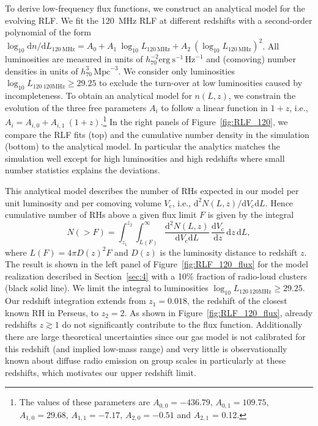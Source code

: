 \documentclass[traditabstract]{aa}
\newcommand{\rmn}{\mathrm}
\begin{document}
To derive low-frequency flux functions, we construct an analytical model for the
evolving RLF. We fit the 120~MHz RLF at different redshifts with a second-order
polynomial of the form $\log_{10} \rmn{d}n/\rmn{d}L_{120~\rmn{MHz}} = A_{0} +
A_{1}~\log_{10} L_{120~\rmn{MHz}} + A_{2}~(\log_{10} L_{120~\rmn{MHz}})^{2}$.
All luminosities are measured in units of $h_{70}^{-2}
\rmn{erg~s}^{-1}\,\rmn{Hz}^{-1}$ and (comoving) number densities in units of
$h_{70}^{3}\,\rmn{Mpc}^{-3}$. We consider only luminosities $\log_{10}
L_{120~\rmn{120MHz}} \geq 29.25$ to exclude the turn-over at low luminosities
caused by incompleteness. To obtain an analytical model for $n(L,z)$, we
constrain the evolution of the three free parameters $A_i$ to follow a linear
function in $1+z$, i.e., $A_{i} = A_{i,0} + A_{i,1}~(1+z)$.\footnote{The values
  of these parameters are $A_{0,0} = -436.79$, $A_{0,1} = 109.75$, $A_{1,0} =
  29.68$, $A_{1,1} = -7.17$, $A_{2,0} = -0.51$ and $A_{2,1}$ = 0.12.} In the
right panels of Figure~\ref{fig:RLF_120}, we compare the RLF fits (top) and the
cumulative number density in the simulation (bottom) to the analytical model. In
particular the analytics matches the simulation well except for high
luminosities and high redshifts where small number statistics explains the
deviations.

This analytical model describes the number of RHs expected in our model per unit
luminosity and per comoving volume $V_{\rmn{c}}$, i.e., $\rmn{d}^2N(L,z)
/\rmn{d}V_{\rmn{c}}\rmn{d}L$. Hence cumulative number of RHs above a given flux
limit $F$ is given by the integral
\begin{equation}
N(>F)  =  \int_{z_1}^{z_2} \int_{L(F)}^{\infty} 
\frac{\rmn{d}^2N(L,z)}{\rmn{d}V_{\rmn{c}}\rmn{d}L}\,
\frac{\rmn{d}V_{\rmn{c}}}{\rmn{d}z}\, \rmn{d}z\, \rmn{d}L ,
\label{eq:NtotRH}
\end{equation}
where $L(F) = 4 \pi D(z)^2 F$ and $D(z)$ is the luminosity distance to redshift
$z$.  The result is shown in the left panel of Figure~\ref{fig:RLF_120_flux} for
the model realization described in Section~\ref{sec:4} with a 10\% fraction of
radio-loud clusters (black solid line). We limit the integral to luminosities
$\log_{10} L_{120~\rmn{120MHz}} \geq 29.25$. Our redshift integration extends
from $z_{1} = 0.018$, the redshift of the closest known RH in Perseus, to $z_{2}
= 2$. As shown in Figure~\ref{fig:RLF_120_flux}, already redshifts $z\gtrsim1$
do not significantly contribute to the flux function. Additionally there are
large theoretical uncertainties since our gas model is not calibrated for this
redshift (and implied low-mass range) and very little is observationally known
about diffuse radio emission on group scales in particularly at these redshifts,
which motivates our upper redshift limit.
\end{document}
